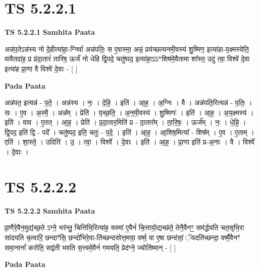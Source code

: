 \documentclass[17pt]{extarticle}
\begin{document}
\section{ TS 5.2.2.1 }

\textbf{TS 5.2.2.1 } \newline
\textbf{Samhita Paata} \newline

अन्न॑प॒तेऽन्न॑स्य नो दे॒हीत्या॑हा॒-ग्निर्वा अन्न॑पतिः॒ स ए॒वास्मा॒ अन्नं॒ प्रय॑च्छत्यनमी॒वस्य॑ शु॒ष्मिण॒ इत्या॑हा-य॒क्ष्मस्येति॒ वावैतदा॑ह॒ प्र प्र॑दा॒तारं॑ तारिष॒ ऊर्जं॑ नो धेहि द्वि॒पदे॒ चतु॑ष्पद॒ इत्या॑हा॒ऽऽ*शिष॑मे॒वैतामा शा᳚स्त॒ उदु॑ त्वा॒ विश्वे॑ दे॒वा इत्या॑ह प्रा॒णा वै विश्वे॑ दे॒वाः - [  ] \newline

\textbf{Pada Paata} \newline

अन्न॑पत॒ इत्यन्न॑ - प॒ते॒ । अन्न॑स्य । नः॒ । दे॒हि॒ । इति॑ । आ॒ह॒ । अ॒ग्निः । वै । अन्न॑पति॒रित्यन्न॑ - प॒तिः॒ । सः । ए॒व । अ॒स्मै॒ । अन्न᳚म् । प्रेति॑ । य॒च्छ॒ति॒ । अ॒न॒मी॒वस्य॑ । शु॒ष्मिणः॑ । इति॑ । आ॒ह॒ । अ॒य॒क्ष्मस्य॑ । इति॑ । वाव । ए॒तत् । आ॒ह॒ । प्रेति॑ । प्र॒दा॒तार॒मिति॑ प्र - दा॒तार᳚म् । ता॒रि॒षः॒ । ऊर्ज᳚म् । नः॒ । धे॒हि॒ । द्वि॒पद॒ इति॑ द्वि - पदे᳚ । चतु॑ष्पद॒ इति॒ चतुः॑ - प॒दे॒ । इति॑ । आ॒ह॒ । आ॒शिष॒मित्या᳚ - शिष᳚म् । ए॒व । ए॒ताम् । एति॑ । शा॒स्ते॒ । उदिति॑ । उ॒ । त्वा॒ । विश्वे᳚ । दे॒वाः । इति॑ । आ॒ह॒ । प्रा॒णा इति॑ प्र-अ॒नाः । वै । विश्वे᳚ । दे॒वाः ।  \newline





\section{ TS 5.2.2.2 }

\textbf{TS 5.2.2.2 } \newline
\textbf{Samhita Paata} \newline

प्रा॒णैरे॒वैन॒मुद्य॑च्छ॒ते ऽग्ने॒ भर॑न्तु॒ चित्ति॑भि॒रित्या॑ह॒ यस्मा॑ ए॒वैनं॑ चि॒त्तायो॒द्यच्छ॑ते॒ तेनै॒वैनꣳ॒॒ सम॑र्द्धयति चत॒सृभि॒रा सा॑दयति च॒त्वारि॒ छन्दाꣳ॑सि॒ छन्दो॑भिरे॒वा-ति॑च्छन्दसोत्त॒मया॒ वर्ष्म॒ वा ए॒षा छन्द॑सां॒ ॅयदति॑च्छन्दा॒ वर्ष्मै॒वैनꣳ॑ समा॒नानां᳚ करोति॒ सद्व॑ती भवति स॒त्त्वमे॒वैनं॑ गमयति॒ प्रेद॑ग्ने॒ ज्योति॑ष्मान् - [  ] \newline

\textbf{Pada Paata} \newline
\end{document}
